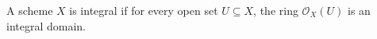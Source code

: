 A scheme $X$ is integral if for every open set $U \subseteq X$, the ring $\mathcal{O}_X(U)$ is an integral domain.
